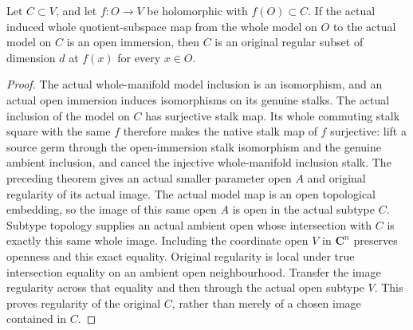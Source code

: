 \begin{theorem}
\label{hir:actual-holomorphic-model-chart-original-regularity}
\leanok
Let $C\subset V$, and let $f:O\to V$ be holomorphic with $f(O)\subset C$.
If the actual induced whole quotient-subspace map from the whole model on
$O$ to the actual model on $C$ is an open immersion, then $C$ is an original
regular subset of dimension $d$ at $f(x)$ for every $x\in O$.
\end{theorem}
\begin{proof}
The actual whole-manifold model inclusion is an isomorphism, and an actual
open immersion induces isomorphisms on its genuine stalks. The actual
inclusion of the model on $C$ has surjective stalk map. Its whole commuting
stalk square with the same $f$ therefore makes the native stalk map of
$f$ surjective: lift a source germ through the open-immersion stalk
isomorphism and the genuine ambient inclusion, and cancel the injective
whole-manifold inclusion stalk. The preceding theorem gives an actual
smaller parameter open $A$ and original regularity of its actual image.
The actual model map is an open topological embedding, so the image of this
same open $A$ is open in the actual subtype $C$. Subtype topology supplies
an actual ambient open whose intersection with $C$ is exactly this same
whole image. Including the coordinate open $V$ in $\mathbf C^n$ preserves
openness and this exact equality. Original regularity is local under true
intersection equality on an ambient open neighbourhood. Transfer the image
regularity across that equality and then through the actual open subtype
$V$. This proves regularity of the original $C$, rather than merely of a
chosen image contained in $C$.
\end{proof}

